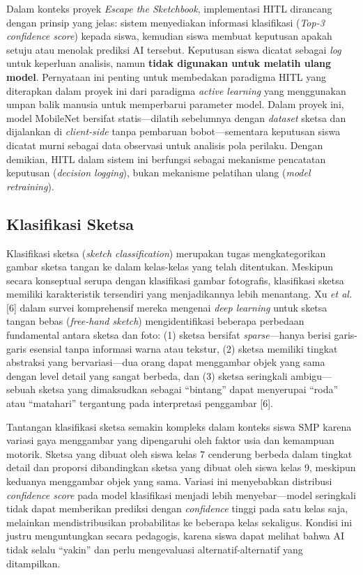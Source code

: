 Dalam konteks proyek \textit{Escape the Sketchbook}, implementasi HITL dirancang dengan prinsip yang jelas: sistem menyediakan informasi klasifikasi (\textit{Top-3 confidence score}) kepada siswa, kemudian siswa membuat keputusan apakah setuju atau menolak prediksi AI tersebut. Keputusan siswa dicatat sebagai \textit{log} untuk keperluan analisis, namun \textbf{tidak digunakan untuk melatih ulang model}. Pernyataan ini penting untuk membedakan paradigma HITL yang diterapkan dalam proyek ini dari paradigma \textit{active learning} yang menggunakan umpan balik manusia untuk memperbarui parameter model. Dalam proyek ini, model MobileNet bersifat statis—dilatih sebelumnya dengan \textit{dataset} sketsa dan dijalankan di \textit{client-side} tanpa pembaruan bobot—sementara keputusan siswa dicatat murni sebagai data observasi untuk analisis pola perilaku. Dengan demikian, HITL dalam sistem ini berfungsi sebagai mekanisme pencatatan keputusan (\textit{decision logging}), bukan mekanisme pelatihan ulang (\textit{model retraining}).

\subsection{Klasifikasi Sketsa}
\label{subsec:klasifikasi-sketsa}

Klasifikasi sketsa (\textit{sketch classification}) merupakan tugas mengkategorikan gambar sketsa tangan ke dalam kelas-kelas yang telah ditentukan. Meskipun secara konseptual serupa dengan klasifikasi gambar fotografis, klasifikasi sketsa memiliki karakteristik tersendiri yang menjadikannya lebih menantang. Xu \textit{et al.} [6] dalam survei komprehensif mereka mengenai \textit{deep learning} untuk sketsa tangan bebas (\textit{free-hand sketch}) mengidentifikasi beberapa perbedaan fundamental antara sketsa dan foto: (1) sketsa bersifat \textit{sparse}—hanya berisi garis-garis esensial tanpa informasi warna atau tekstur, (2) sketsa memiliki tingkat abstraksi yang bervariasi—dua orang dapat menggambar objek yang sama dengan level detail yang sangat berbeda, dan (3) sketsa seringkali ambigu—sebuah sketsa yang dimaksudkan sebagai ``bintang'' dapat menyerupai ``roda'' atau ``matahari'' tergantung pada interpretasi penggambar [6].

Tantangan klasifikasi sketsa semakin kompleks dalam konteks siswa SMP karena variasi gaya menggambar yang dipengaruhi oleh faktor usia dan kemampuan motorik. Sketsa yang dibuat oleh siswa kelas 7 cenderung berbeda dalam tingkat detail dan proporsi dibandingkan sketsa yang dibuat oleh siswa kelas 9, meskipun keduanya menggambar objek yang sama. Variasi ini menyebabkan distribusi \textit{confidence score} pada model klasifikasi menjadi lebih menyebar—model seringkali tidak dapat memberikan prediksi dengan \textit{confidence} tinggi pada satu kelas saja, melainkan mendistribusikan probabilitas ke beberapa kelas sekaligus. Kondisi ini justru menguntungkan secara pedagogis, karena siswa dapat melihat bahwa AI tidak selalu ``yakin'' dan perlu mengevaluasi alternatif-alternatif yang ditampilkan.

